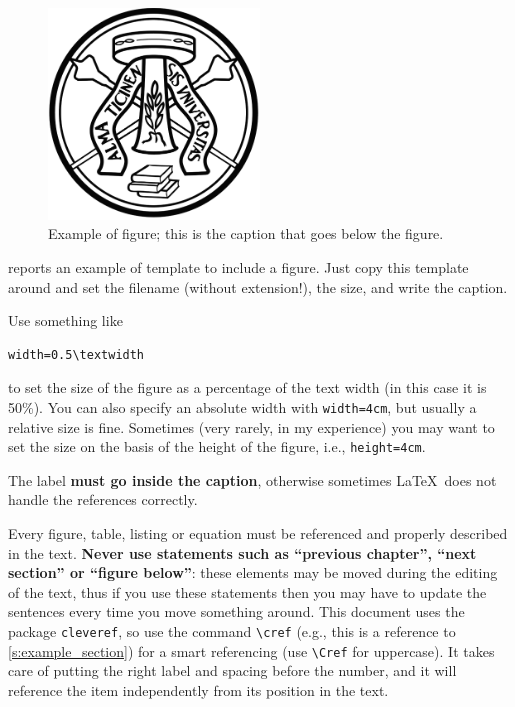 \begin{figure}
\centering
\includegraphics[width=0.5\textwidth]{figs/logo-unipv-bw}
\caption[This is the text that goes in the list of figures]{Example of figure; this is the caption that goes below the figure.\label{f:logo}}
\end{figure}

 reports an example of template to include a figure.
Just copy this template around and set the filename (without extension!), the size, and write the caption.

Use something like

\begin{verbatim}
width=0.5\textwidth
\end{verbatim}

to set the size of the figure as a percentage of the text width (in this case it is 50\%).
You can also specify an absolute width with \texttt{width=4cm}, but usually a relative size is fine.
Sometimes (very rarely, in my experience) you may want to set the size on the basis of the height of the figure, i.e., \texttt{height=4cm}.

The label \textbf{must go inside the caption}, otherwise sometimes \LaTeX\ does not handle the references correctly.

Every figure, table, listing or equation must be referenced and properly described in the text.
\textbf{Never use statements such as \enquote{previous chapter}, \enquote{next section} or \enquote{figure below}}: these elements may be moved during the editing of the text, thus if you use these statements then you may have to update the sentences every time you move something around.
This document uses the package \texttt{cleveref}, so use the command \texttt{\textbackslash cref} (e.g., this is a reference to \cref{s:example_section}) for a smart referencing (use \texttt{\textbackslash Cref} for uppercase).
It takes care of putting the right label and spacing before the number, and it will reference the item independently from its position in the text.


